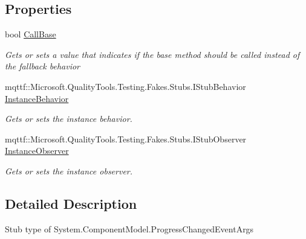 \subsection*{Properties}
\begin{DoxyCompactItemize}
\item 
bool \hyperlink{class_system_1_1_component_model_1_1_fakes_1_1_stub_progress_changed_event_args_a0303dfe6b1da11ae4a893b7775ca180e}{Call\-Base}
\begin{DoxyCompactList}\small\item\em Gets or sets a value that indicates if the base method should be called instead of the fallback behavior\end{DoxyCompactList}\item 
mqttf\-::\-Microsoft.\-Quality\-Tools.\-Testing.\-Fakes.\-Stubs.\-I\-Stub\-Behavior \hyperlink{class_system_1_1_component_model_1_1_fakes_1_1_stub_progress_changed_event_args_a7cfc4ffb35ad494ea1b99b47d99fa0e4}{Instance\-Behavior}
\begin{DoxyCompactList}\small\item\em Gets or sets the instance behavior.\end{DoxyCompactList}\item 
mqttf\-::\-Microsoft.\-Quality\-Tools.\-Testing.\-Fakes.\-Stubs.\-I\-Stub\-Observer \hyperlink{class_system_1_1_component_model_1_1_fakes_1_1_stub_progress_changed_event_args_a78aded7177cb8a3756d322af6e3094a3}{Instance\-Observer}
\begin{DoxyCompactList}\small\item\em Gets or sets the instance observer.\end{DoxyCompactList}\end{DoxyCompactItemize}


\subsection{Detailed Description}
Stub type of System.\-Component\-Model.\-Progress\-Changed\-Event\-Args



